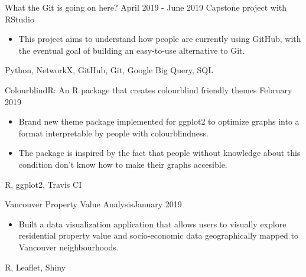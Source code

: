 %
%
%


\begin{projects}
    
    \project
    {What the Git is going on here?}
    {April 2019 - June 2019}
    {Capstone project with RStudio}
    {\begin{itemize}
        \item This project aims to understand how people are currently using GitHub, with the eventual goal of building an easy-to-use alternative to Git.
    \end{itemize}}
    {Python, NetworkX, GitHub, Git, Google Big Query, SQL}
    
    \project
    {ColourblindR: An R package that creates colourblind friendly themes}
    {February 2019}
    {}
    {\begin{itemize}
        \item Brand new theme package implemented for ggplot2 to optimize graphs into a format interpretable by people with colourblindness.
        \item The package is inspired by the fact that people without knowledge about this condition don’t know how to make their graphs accesible.
    \end{itemize}}
    {R, ggplot2, Travis CI}

    \project
    {Vancouver Property Value Analysis}{January 2019}
    {}
    {\begin{itemize}
    \item Built a data visualization application that allows users to visually explore residential property value and socio-economic data geographically mapped to Vancouver neighbourhoods.
    \end{itemize}}
    {R, Leaflet, Shiny}



\end{projects}
